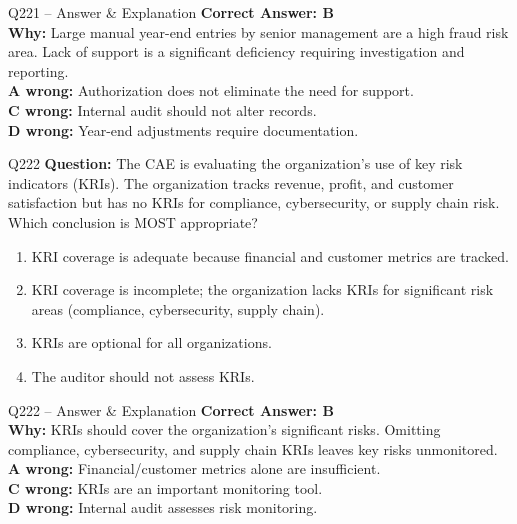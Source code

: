 \documentclass[aspectratio=169,10pt]{beamer}
\begin{document}
	\begin{frame}[t]{Q221 -- Answer \& Explanation}
		\small
		\textbf{Correct Answer: B} \\[4pt]
		\textbf{Why:} Large manual year-end entries by senior management are a high fraud risk area. Lack of support is a significant deficiency requiring investigation and reporting. \\[4pt]
		\textbf{A wrong:} Authorization does not eliminate the need for support. \\[2pt]
		\textbf{C wrong:} Internal audit should not alter records. \\[2pt]
		\textbf{D wrong:} Year-end adjustments require documentation.
	\end{frame}
	
	\begin{frame}[t]{Q222}
		\small
		\textbf{Question:} The CAE is evaluating the organization's use of key risk indicators (KRIs). The organization tracks revenue, profit, and customer satisfaction but has no KRIs for compliance, cybersecurity, or supply chain risk. Which conclusion is MOST appropriate?
		\begin{enumerate}[label=\Alph*.,itemsep=1pt,topsep=2pt]
			\item KRI coverage is adequate because financial and customer metrics are tracked.
			\item KRI coverage is incomplete; the organization lacks KRIs for significant risk areas (compliance, cybersecurity, supply chain).
			\item KRIs are optional for all organizations.
			\item The auditor should not assess KRIs.
		\end{enumerate}
	\end{frame}
	
	\begin{frame}[t]{Q222 -- Answer \& Explanation}
		\small
		\textbf{Correct Answer: B} \\[4pt]
		\textbf{Why:} KRIs should cover the organization's significant risks. Omitting compliance, cybersecurity, and supply chain KRIs leaves key risks unmonitored. \\[4pt]
		\textbf{A wrong:} Financial/customer metrics alone are insufficient. \\[2pt]
		\textbf{C wrong:} KRIs are an important monitoring tool. \\[2pt]
		\textbf{D wrong:} Internal audit assesses risk monitoring.
	\end{frame}
	
\end{document}

